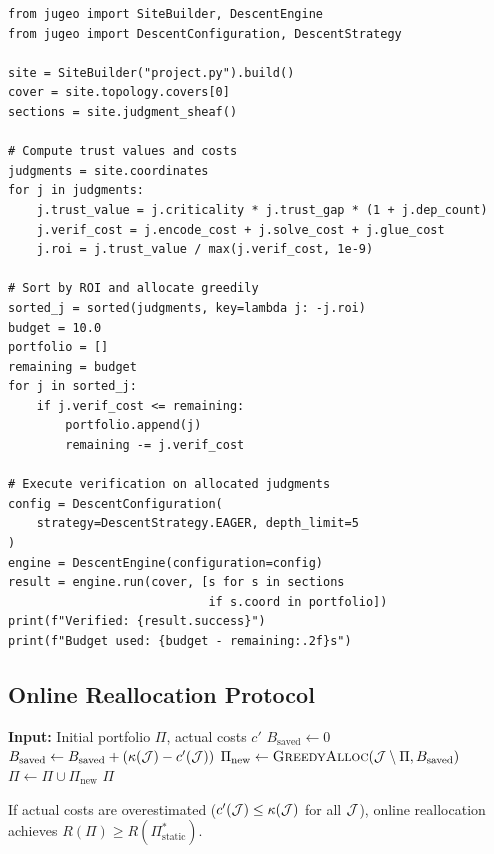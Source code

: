 \documentclass[11pt]{article}
\newcommand{\VerifCost}{\kappa}
\begin{document}
\begin{lstlisting}[style=jugeo-python]
from jugeo import SiteBuilder, DescentEngine
from jugeo import DescentConfiguration, DescentStrategy

site = SiteBuilder("project.py").build()
cover = site.topology.covers[0]
sections = site.judgment_sheaf()

# Compute trust values and costs
judgments = site.coordinates
for j in judgments:
    j.trust_value = j.criticality * j.trust_gap * (1 + j.dep_count)
    j.verif_cost = j.encode_cost + j.solve_cost + j.glue_cost
    j.roi = j.trust_value / max(j.verif_cost, 1e-9)

# Sort by ROI and allocate greedily
sorted_j = sorted(judgments, key=lambda j: -j.roi)
budget = 10.0
portfolio = []
remaining = budget
for j in sorted_j:
    if j.verif_cost <= remaining:
        portfolio.append(j)
        remaining -= j.verif_cost

# Execute verification on allocated judgments
config = DescentConfiguration(
    strategy=DescentStrategy.EAGER, depth_limit=5
)
engine = DescentEngine(configuration=config)
result = engine.run(cover, [s for s in sections
                            if s.coord in portfolio])
print(f"Verified: {result.success}")
print(f"Budget used: {budget - remaining:.2f}s")
\end{lstlisting}

\subsection{Online Reallocation Protocol}

\begin{algorithm}[H]
\caption{Online Budget Reallocation}
\label{alg:online-realloc}
\begin{algorithmic}[1]
\STATE \textbf{Input:} Initial portfolio $\Pi$, actual costs $c'$
\STATE $B_{\text{saved}} \gets 0$
  \STATE $B_{\text{saved}} \gets B_{\text{saved}} +
         (\VerifCost(\J) - c'(\J))$
\ENDFOR
\STATE $\Pi_{\text{new}} \gets \textsc{GreedyAlloc}(
       \mathcal{J} \setminus \Pi, B_{\text{saved}})$
\STATE $\Pi \gets \Pi \cup \Pi_{\text{new}}$
\RETURN $\Pi$
\end{algorithmic}
\end{algorithm}

\begin{proposition}\label{prop:realloc}
If actual costs are overestimated ($c'(\J) \leq \VerifCost(\J)$ for
all $\mathcal{J}$), online reallocation achieves $R(\Pi) \geq R(\Pi^*_{\text{static}})$.
\end{proposition}
\end{document}
